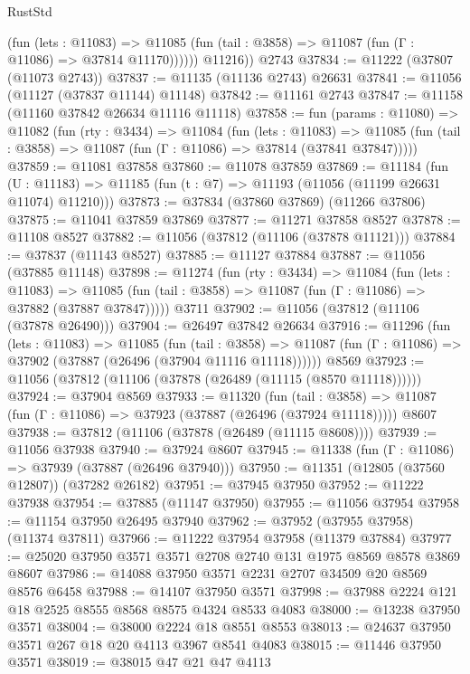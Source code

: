 \begin{lexlean}{RustStd}
\begin{coremodule}
              (fun (lets : @11083) =>
              @11085 (fun (tail : @3858) => @11087 (fun (Γ : @11086) => @37814 @11170))))))
        @11216))
    @2743
@37834 := @11222 (@37807 (@11073 @2743))
@37837 := @11135 (@11136 @2743) @26631
@37841 := @11056 (@11127 (@37837 @11144) @11148)
@37842 := @11161 @2743
@37847 := @11158 (@11160 @37842 @26634 @11116 @11118)
@37858 := fun (params : @11080) =>
  @11082
    (fun (rty : @3434) =>
    @11084
      (fun (lets : @11083) =>
      @11085 (fun (tail : @3858) => @11087 (fun (Γ : @11086) => @37814 (@37841 @37847)))))
@37859 := @11081 @37858
@37860 := @11078 @37859
@37869 := @11184
    (fun (U : @11183) => @11185 (fun (t : @7) => @11193 (@11056 (@11199 @26631 @11074) @11210)))
@37873 := @37834 (@37860 @37869) (@11266 @37806)
@37875 := @11041 @37859 @37869
@37877 := @11271 @37858 @8527
@37878 := @11108 @8527
@37882 := @11056 (@37812 (@11106 (@37878 @11121)))
@37884 := @37837 (@11143 @8527)
@37885 := @11127 @37884
@37887 := @11056 (@37885 @11148)
@37898 := @11274
    (fun (rty : @3434) =>
    @11084
      (fun (lets : @11083) =>
      @11085 (fun (tail : @3858) => @11087 (fun (Γ : @11086) => @37882 (@37887 @37847)))))
    @3711
@37902 := @11056 (@37812 (@11106 (@37878 @26490)))
@37904 := @26497 @37842 @26634
@37916 := @11296
    (fun (lets : @11083) =>
    @11085
      (fun (tail : @3858) =>
      @11087 (fun (Γ : @11086) => @37902 (@37887 (@26496 (@37904 @11116 @11118))))))
    @8569
@37923 := @11056 (@37812 (@11106 (@37878 (@26489 (@11115 (@8570 @11118))))))
@37924 := @37904 @8569
@37933 := @11320
    (fun (tail : @3858) => @11087 (fun (Γ : @11086) => @37923 (@37887 (@26496 (@37924 @11118)))))
    @8607
@37938 := @37812 (@11106 (@37878 (@26489 (@11115 @8608))))
@37939 := @11056 @37938
@37940 := @37924 @8607
@37945 := @11338 (fun (Γ : @11086) => @37939 (@37887 (@26496 @37940)))
@37950 := @11351 (@12805 (@37560 @12807)) (@37282 @26182)
@37951 := @37945 @37950
@37952 := @11222 @37938
@37954 := @37885 (@11147 @37950)
@37955 := @11056 @37954
@37958 := @11154 @37950 @26495 @37940
@37962 := @37952 (@37955 @37958) (@11374 @37811)
@37966 := @11222 @37954 @37958 (@11379 @37884)
@37977 := @25020 @37950 @3571 @3571 @2708 @2740 @131 @1975 @8569 @8578 @3869 @8607
@37986 := @14088 @37950 @3571 @2231 @2707 @34509 @20 @8569 @8576 @6458
@37988 := @14107 @37950 @3571
@37998 := @37988 @2224 @121 @18 @2525 @8555 @8568 @8575 @4324 @8533 @4083
@38000 := @13238 @37950 @3571
@38004 := @38000 @2224 @18 @8551 @8553
@38013 := @24637 @37950 @3571 @267 @18 @20 @4113 @3967 @8541 @4083
@38015 := @11446 @37950 @3571
@38019 := @38015 @47 @21 @47 @4113

\end{coremodule}
\end{lexlean}
